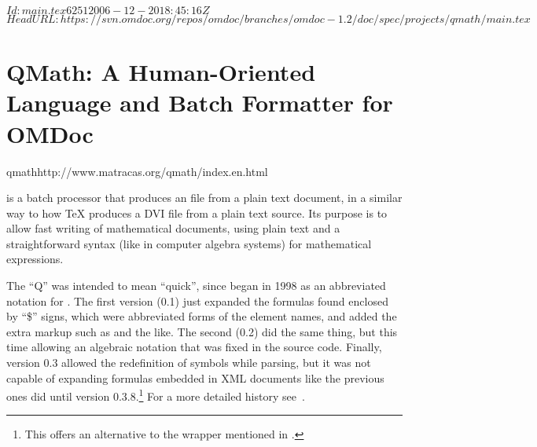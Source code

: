 \svnInfo $Id: main.tex 6251 2006-12-20 18:45:16Z  $
\svnKeyword $HeadURL: https://svn.omdoc.org/repos/omdoc/branches/omdoc-1.2/doc/spec/projects/qmath/main.tex $

\section[QMath Parser]{QMath: A Human-Oriented Language and Batch Formatter for
  OMDoc}

\begin{project}{qmath}{http://www.matracas.org/qmath/index.en.html}
\end{project}

{\qmath} is a batch processor that produces an {\omdoc} file from a plain {\unicode}
text document, in a similar way to how {\TeX} produces a DVI file from a plain
text source. Its purpose is to allow fast writing of mathematical
documents, using plain text and a straightforward syntax (like in computer algebra
systems) for mathematical expressions.

The ``Q'' was intended to mean ``quick'', since {\qmath} began in 1998 as an abbreviated
notation for {\mathml}. The first version (0.1) just expanded the formulas found enclosed
by ``{\$}'' signs, which were abbreviated forms of the {\mathml} element names, and added
the extra markup such as {} and the like. The second (0.2) did the same
thing, but this time allowing an algebraic notation that was fixed in the source code.
Finally, version 0.3 allowed the redefinition of symbols while parsing, but it was not
capable of expanding formulas embedded in XML documents like the previous ones did until
version 0.3.8.\footnote{\footnotesize{This offers an alternative to the {}
    wrapper mentioned in {}.}}  For a more detailed history
see~\cite{QMathHistory:URL}.

